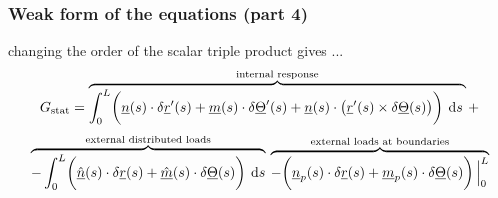 \begin{frame}
  \frametitle{Weak form of the equations (part 4)}
  
  changing the order of the scalar triple product gives ...
  \begin{displaymath}
    G_{\text{stat}} = 
    \overbrace{
      \int_0^L \biggl( 
        \underline{n}(s) \cdot \delta \underline{r}^{\prime}(s)
      + \underline{m}(s) \cdot \delta \underline{\Theta}^{\prime}(s)
      + \underline{n}(s) \cdot \bigl( \underline{r}^{\prime}(s) \times \delta \underline{\Theta}(s) \bigr)
      \biggr) \: \dif s \: 
    }^{\text{internal response}} + 
  \end{displaymath}
  \begin{displaymath}
    \overbrace{
    - \int_0^L \biggl( 
        \underline{\hat{n}}(s) \cdot \delta \underline{r}(s)
      + \underline{\hat{m}}(s) \cdot \delta \underline{\Theta}(s)
     \biggr) \: \dif s
    }^{\text{external distributed loads}} \:
    \overbrace{
    - \biggl(
      \underline{n}_p(s) \cdot \delta \underline{r}(s) +
      \underline{m}_p(s) \cdot \delta \underline{\Theta}(s)
    \biggr) \sVert[2]_0^L
    }^{\text{external loads at boundaries}}
  \end{displaymath}
  

\end{frame}
